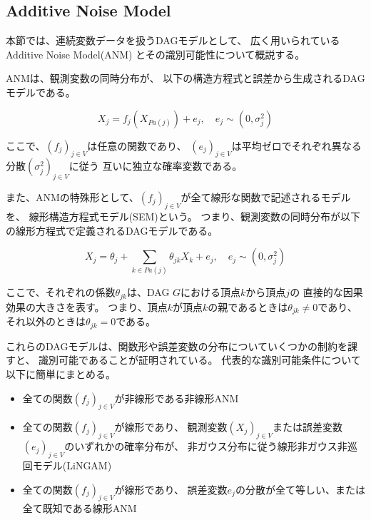 
\subsection{Additive Noise Model}

本節では、連続変数データを扱うDAGモデルとして、
広く用いられているAdditive Noise Model(ANM)
\cite{Shimizu2006-yu}
\cite{Hoyer2008-oo}
\cite{Peters2013-eb}
\cite{Peters2014-ro}
\cite{Park2020-ey}
とその識別可能性について概説する。

ANMは、観測変数の同時分布が、
以下の構造方程式と誤差から生成されるDAGモデルである。

\begin{equation}
  X_j = f_j(X_{Pa(j)}) + e_j , \quad e_j \sim (0, \sigma_j^2)
  \label{def:ANM}
\end{equation}

ここで、$(f_j)_{j\in V}$は任意の関数であり、
$(e_j)_{j\in V}$は平均ゼロでそれぞれ異なる分散$(\sigma_j^2)_{j\in V}$に従う
互いに独立な確率変数である。

また、ANMの特殊形として、$(f_j)_{j\in V}$が全て線形な関数で記述されるモデルを、
線形構造方程式モデル(SEM)という。
つまり、観測変数の同時分布が以下の線形方程式で定義されるDAGモデルである。

\begin{equation}
  X_j = \theta_j + \sum_{k \in Pa(j)} \theta_{jk} X_k + e_j, \quad e_j \sim (0, \sigma_j^2)
\end{equation}

ここで、それぞれの係数$\theta_{jk}$は、DAG $G$における頂点$k$から頂点$j$の
直接的な因果効果の大きさを表す。
つまり、頂点$k$が頂点$k$の親であるときは$\theta_{jk} \neq 0$であり、
それ以外のときは$\theta_{jk}=0$である。

これらのDAGモデルは、関数形や誤差変数の分布についていくつかの制約を課すと、
識別可能であることが証明されている。
代表的な識別可能条件について以下に簡単にまとめる。

\begin{itemize}
  \item
  全ての関数$(f_j)_{j \in V}$が非線形である非線形ANM\cite{Hoyer2008-oo}

  \item
  全ての関数$(f_j)_{j \in V}$が線形であり、
  観測変数$(X_j)_{j \in V}$または誤差変数$(e_j)_{j\in V}$のいずれかの確率分布が、
  非ガウス分布に従う線形非ガウス非巡回モデル(LiNGAM)\cite{Shimizu2006-yu}

  \item
  全ての関数$(f_j)_{j \in V}$が線形であり、
  誤差変数$e_j$の分散が全て等しい、または全て既知である線形ANM\cite{Peters2013-eb}
\end{itemize}
